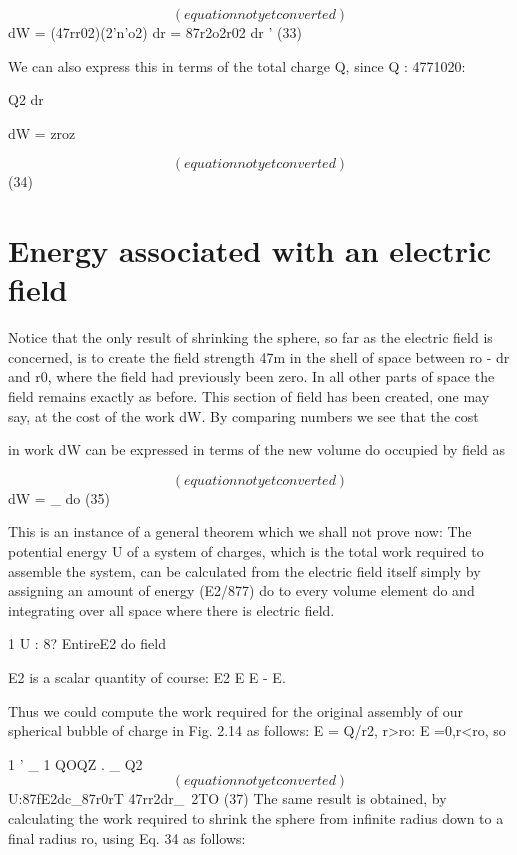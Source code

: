 \begin{equation}
(equation not yet converted)
\end{equation}
dW = (47rr02)(2'n'o2) dr = 87r2o2r02 dr ' (33)

We can also express this in terms of the total charge Q, since
Q : 4771020:

Q2 dr

dW = zroz

\begin{equation}
(equation not yet converted)
\end{equation}
(34)

\section{Energy associated with an electric field}

Notice that the only result of shrinking the sphere, so far as the
electric field is concerned, is to create the field strength 47m in the
shell of space between ro - dr and r0, where the field had previously
been zero. In all other parts of space the field remains exactly as
before. This section of field has been created, one may say, at the
cost of the work dW. By comparing numbers we see that the cost

in work dW can be expressed in terms of the new volume do occupied
by field as

\begin{equation}
(equation not yet converted)
\end{equation}
dW = _ do (35)

This is an instance of a general theorem which we shall not prove
now: The potential energy U of a system of charges, which is the total
work required to assemble the system, can be calculated from the electric
field itself simply by assigning an amount of energy (E2/877) do to
every volume element do and integrating over all space where there
is electric field.

1
U : 8? EntireE2 do 
field

E2 is a scalar quantity of course: E2 E E - E.

Thus we could compute the work required for the original assembly
of our spherical bubble of charge in Fig. 2.14 as follows: E = Q/r2,
r>ro: E =0,r<ro, so

1 ' _ 1 QOQZ . _ Q2
\begin{equation}
(equation not yet converted)
\end{equation}
U:87fE2dc_87r0rT 47rr2dr_~2TO (37)
The same result is obtained, by calculating the work required to
shrink the sphere from infinite radius down to a final radius ro, using
Eq. 34 as follows:

